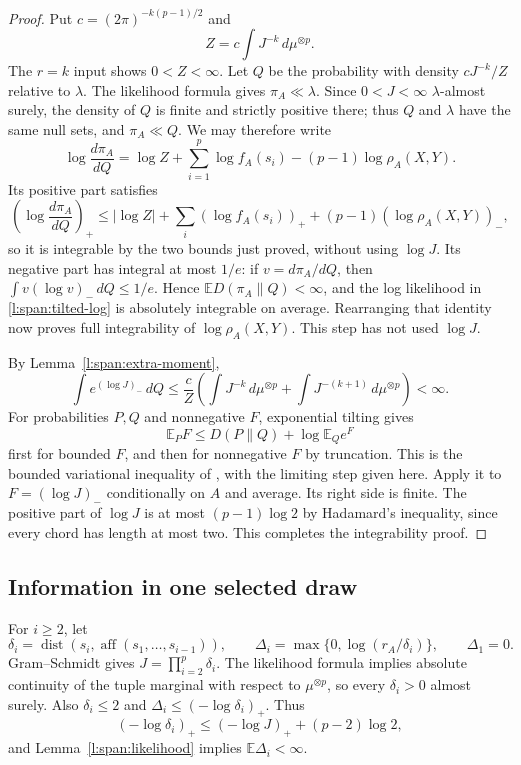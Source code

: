 \begin{proof}
Put \(c=(2\pi)^{-k(p-1)/2}\) and
\[
 Z=c\int J^{-k}\,d\mu^{\otimes p}.
\]
The \(r=k\) input shows \(0<Z<\infty\).  Let \(Q\) be the probability
with density \(cJ^{-k}/Z\) relative to \(\lambda\).  The likelihood
formula gives \(\pi_A\ll\lambda\).  Since \(0<J<\infty\)
\(\lambda\)-almost surely, the density of \(Q\) is finite and strictly
positive there; thus \(Q\) and \(\lambda\) have the same null sets,
and \(\pi_A\ll Q\).  We may therefore write
\begin{equation}
 \log\frac{d\pi_A}{dQ}
   =\log Z+\sum_{i=1}^p\log f_A(s_i)
       -(p-1)\log\rho_A(X,Y).
 \label{l:span:tilted-log}
\end{equation}
Its positive part satisfies
\[
 \left(\log\frac{d\pi_A}{dQ}\right)_+
 \le |\log Z|+\sum_i(\log f_A(s_i))_+
       +(p-1)(\log\rho_A(X,Y))_-,
\]
so it is integrable by the two bounds just proved, without using
\(\log J\).  Its negative part has integral at most \(1/e\):
if \(v=d\pi_A/dQ\), then
\(\int v(\log v)_-\,dQ\le1/e\).  Hence
\(\mathbb E D(\pi_A\|Q)<\infty\), and the log likelihood in
\eqref{l:span:tilted-log} is absolutely integrable on average.
Rearranging that identity now proves full integrability of
\(\log\rho_A(X,Y)\).  This step has not used \(\log J\).

By Lemma~\ref{l:span:extra-moment},
\[
 \int e^{(\log J)_-}\,dQ
 \le \frac cZ\left(
       \int J^{-k}\,d\mu^{\otimes p}
       +\int J^{-(k+1)}\,d\mu^{\otimes p}\right)<\infty.
\]
For probabilities \(P,Q\) and nonnegative \(F\), exponential tilting
gives
\[
 \mathbb E_P F\le D(P\|Q)+\log\mathbb E_Q e^F
\]
first for bounded \(F\), and then for nonnegative \(F\) by truncation.
This is the bounded variational inequality of
\cite[Equations~(1.1)--(1.2)]{DupuisMao2022}, with the limiting step
given here.  Apply it to \(F=(\log J)_-\) conditionally on \(A\) and
average.  Its right side is finite.  The positive part of \(\log J\)
is at most \((p-1)\log2\) by Hadamard's inequality, since every chord
has length at most two.  This completes the integrability proof.
\end{proof}

\subsection{Information in one selected draw}

For \(i\ge2\), let
\[
 \delta_i=\operatorname{dist}\!
   \left(s_i,\operatorname{aff}(s_1,\ldots,s_{i-1})\right),
 \qquad
 \Delta_i=\max\{0,\log(r_A/\delta_i)\},
 \qquad \Delta_1=0.
\]
Gram--Schmidt gives \(J=\prod_{i=2}^p\delta_i\).  The likelihood
formula implies absolute continuity of the tuple marginal with
respect to \(\mu^{\otimes p}\), so every \(\delta_i>0\) almost surely.
Also \(\delta_i\le2\) and
\(\Delta_i\le(-\log\delta_i)_+\).  Thus
\[
 (-\log\delta_i)_+
 \le(-\log J)_++(p-2)\log2,
\]
and Lemma~\ref{l:span:likelihood} implies
\(\mathbb E\Delta_i<\infty\).

